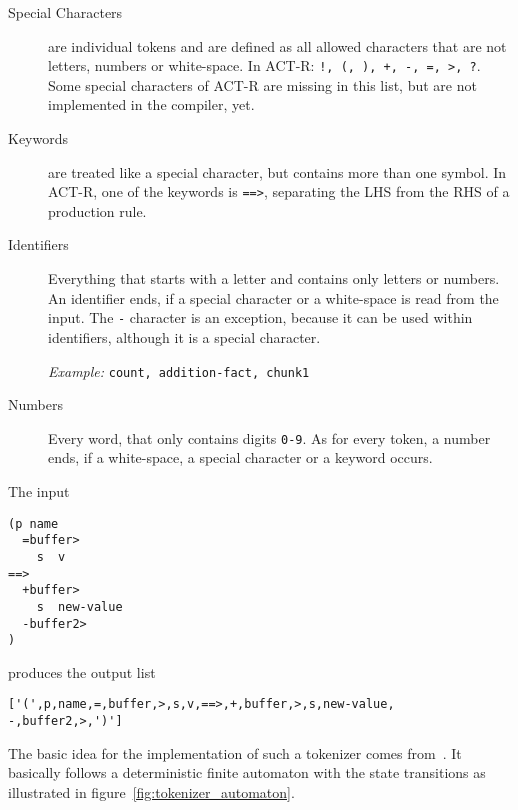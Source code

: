 \begin{description}
 \item[Special Characters] are individual tokens and are defined as all allowed characters that are not letters, numbers or white-space. In ACT-R: \lstinline|!, (, ), +, -, =, >, ?|. Some special characters of ACT-R are missing in this list, but are not implemented in the compiler, yet.
 \item[Keywords] are treated like a special character, but contains more than one symbol. In ACT-R, one of the keywords is \lstinline|==>|, separating the LHS from the RHS of a production rule.
 \item[Identifiers] Everything that starts with a letter and contains only letters or numbers. An identifier ends, if a special character or a white-space is read from the input. The \lstinline|-| character is an exception, because it can be used within identifiers, although it is a special character.
 
 \emph{Example:} \lstinline|count, addition-fact, chunk1|
 \item[Numbers] Every word, that only contains digits \lstinline|0-9|. As for every token, a number ends, if a white-space, a special character or a keyword occurs.
\end{description}

\begin{example}
The input 

\begin{lstlisting}
(p name
  =buffer>
    s  v
==>
  +buffer>
    s  new-value
  -buffer2>
)
\end{lstlisting}

produces the output list

\begin{lstlisting}
['(',p,name,=,buffer,>,s,v,==>,+,buffer,>,s,new-value, -,buffer2,>,')']
\end{lstlisting}
\end{example}

The basic idea for the implementation of such a tokenizer comes from~\cite[19\psqq]{prolog_tokenizer}. It basically follows a deterministic finite automaton with the state transitions as illustrated in figure~\ref{fig:tokenizer_automaton}.


